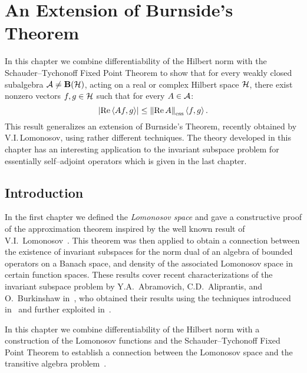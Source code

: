 \def\baselinestretch{1}

\chapter{An Extension of Burnside's Theorem}

\def\baselinestretch{1.66}



In this chapter we combine differentiability of the Hilbert
norm with the Schauder--Tychonoff Fixed Point Theorem to show
that for every weakly closed subalgebra ${\cal A}\neq\mathbf B(\cal H)$, acting on
a real or complex Hilbert space ${\cal H}$, there exist nonzero
vectors $f,g\in{\cal H}$ such that for every $A\in{\cal A}$:
\[ \abs{\RE\seq{A f,g}}\leq\essnorm{\RE A}\seq{f,g}. \]
This result generalizes an extension of Burnside's Theorem,
recently obtained by V.I.\,Lomonosov, using rather different
techniques. The theory developed in this chapter has an
interesting application to the invariant subspace problem for
essentially self--adjoint operators which is given in the last
chapter.

\goodbreak
\section{Introduction}

In the first chapter we defined the {\em Lomonosov space} and
gave a constructive proof of the approximation theorem inspired
by the well known result of V.I.~Lomonosov~\cite{Lom73}. This
theorem was then applied to obtain a connection between the
existence of invariant subspaces for the norm dual of an
algebra of bounded operators on a Banach space, and density of
the associated Lomonosov space in certain function spaces.
These results cover recent characterizations of the invariant
subspace problem by Y.A.~Abramovich, C.D.~Aliprantis, and
O.~Burkinshaw in~\cite{AAB95}, who obtained their results using
the techniques introduced in~\cite{Lom91} and further exploited
in~\cite{dB93}.

\medskip

In this chapter we combine differentiability of the Hilbert
norm with a construction of the Lomonosov functions and the
Schauder--Tychonoff Fixed Point Theorem to establish a
connection between the Lomonosov space and the transitive
algebra problem~\cite{RR73}.

